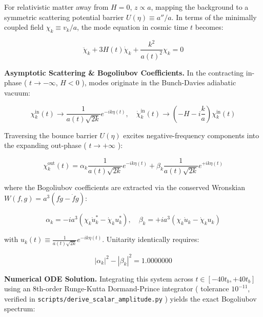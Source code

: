\documentclass[11pt,a4paper]{article}
\theoremstyle{definition}\newtheorem{definition}{Definition}
\theoremstyle{remark}\newtheorem{remark}{Remark}
\begin{document}
For relativistic matter away from $H=0$, $z \propto a$, mapping the background to a symmetric scattering potential barrier $U(\eta) \equiv a''/a$. In terms of the minimally coupled field $\chi_k \equiv v_k / a$, the mode equation in cosmic time $t$ becomes:


\begin{equation}
\ddot{\chi}_k + 3H(t) \dot{\chi}_k + \frac{k^2}{a(t)^2} \chi_k = 0
\end{equation}


\textbf{Asymptotic Scattering \& Bogoliubov Coefficients.} In the contracting in-phase ( $t \to -\infty$, $H < 0$ ), modes originate in the Bunch-Davies adiabatic vacuum:


\begin{equation}
\chi_k^{\text{in}}(t) \to \frac{1}{a(t)\sqrt{2k}} e^{-i k \eta(t)}, \quad \dot{\chi}_k^{\text{in}}(t) \to \left( -H - i \frac{k}{a} \right) \chi_k^{\text{in}}(t)
\end{equation}


Traversing the bounce barrier $U(\eta)$ excites negative-frequency components into the expanding out-phase ( $t \to +\infty$ ):


\begin{equation}
\chi_k^{\text{out}}(t) = \alpha_k \frac{1}{a(t)\sqrt{2k}} e^{-i k \eta(t)} + \beta_k \frac{1}{a(t)\sqrt{2k}} e^{+i k \eta(t)}
\end{equation}


where the Bogoliubov coefficients are extracted via the conserved Wronskian $W(f, g) = a^3(f\dot{g} - \dot{f}g)$:


\begin{equation}
\alpha_k = -i a^3 \left( \chi_k \dot{u}_k^* - \dot{\chi}_k u_k^* \right), \quad \beta_k = +i a^3 \left( \chi_k \dot{u}_k - \dot{\chi}_k u_k \right)
\end{equation}


with $u_k(t) \equiv \frac{1}{a(t)\sqrt{2k}} e^{-ik\eta(t)}$. Unitarity identically requires:


\begin{equation}
|\alpha_k|^2 - |\beta_k|^2 = 1.0000000
\end{equation}


\textbf{Numerical ODE Solution.} Integrating this system across $t \in [-40 t_b, +40 t_b]$ using an 8th-order Runge-Kutta Dormand-Prince integrator ( tolerance $10^{-11}$, verified in \texttt{scripts/derive_scalar_amplitude.py} ) yields the exact Bogoliubov spectrum:
\end{document}
